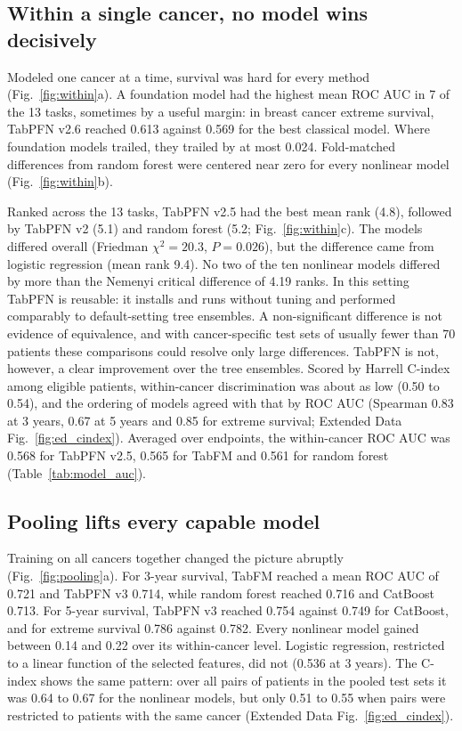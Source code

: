 \documentclass[pdflatex,sn-nature]{sn-jnl}
\begin{document}
\subsection*{Within a single cancer, no model wins decisively}

Modeled one cancer at a time, survival was hard for every method (Fig.~\ref{fig:within}a). A foundation model had the highest mean ROC AUC in 7 of the 13 tasks, sometimes by a useful margin: in breast cancer extreme survival, TabPFN v2.6 reached 0.613 against 0.569 for the best classical model. Where foundation models trailed, they trailed by at most 0.024. Fold-matched differences from random forest were centered near zero for every nonlinear model (Fig.~\ref{fig:within}b).

Ranked across the 13 tasks, TabPFN v2.5 had the best mean rank (4.8), followed by TabPFN v2 (5.1) and random forest (5.2; Fig.~\ref{fig:within}c). The models differed overall (Friedman $\chi^2 = 20.3$, $P = 0.026$), but the difference came from logistic regression (mean rank 9.4). No two of the ten nonlinear models differed by more than the Nemenyi critical difference of 4.19 ranks.\citep{demsar2006statistical} In this setting TabPFN is reusable: it installs and runs without tuning and performed comparably to default-setting tree ensembles. A non-significant difference is not evidence of equivalence, and with cancer-specific test sets of usually fewer than 70 patients these comparisons could resolve only large differences. TabPFN is not, however, a clear improvement over the tree ensembles. Scored by Harrell C-index among eligible patients, within-cancer discrimination was about as low (0.50 to 0.54), and the ordering of models agreed with that by ROC AUC (Spearman 0.83 at 3 years, 0.67 at 5 years and 0.85 for extreme survival; Extended Data Fig.~\ref{fig:ed_cindex}). Averaged over endpoints, the within-cancer ROC AUC was 0.568 for TabPFN v2.5, 0.565 for TabFM and 0.561 for random forest (Table~\ref{tab:model_auc}).



\subsection*{Pooling lifts every capable model}

Training on all cancers together changed the picture abruptly (Fig.~\ref{fig:pooling}a). For 3-year survival, TabFM reached a mean ROC AUC of 0.721 and TabPFN v3 0.714, while random forest reached 0.716 and CatBoost 0.713. For 5-year survival, TabPFN v3 reached 0.754 against 0.749 for CatBoost, and for extreme survival 0.786 against 0.782. Every nonlinear model gained between 0.14 and 0.22 over its within-cancer level. Logistic regression, restricted to a linear function of the selected features, did not (0.536 at 3 years). The C-index shows the same pattern: over all pairs of patients in the pooled test sets it was 0.64 to 0.67 for the nonlinear models, but only 0.51 to 0.55 when pairs were restricted to patients with the same cancer (Extended Data Fig.~\ref{fig:ed_cindex}).
\end{document}
